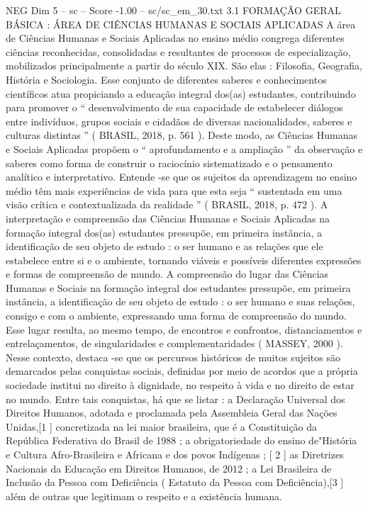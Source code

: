 \begin{textsample}{NEG Dim 5 – sc – Score -1.00 – sc/sc\_em\_30.txt}  \label{ex:f5_neg_254}
3.1 FORMAÇÃO GERAL BÁSICA : ÁREA DE CIÊNCIAS HUMANAS E SOCIAIS APLICADAS A área de Ciências Humanas e Sociais Aplicadas no ensino médio congrega diferentes ciências reconhecidas, consolidadas e resultantes de processos de especialização, mobilizados principalmente a partir do século XIX.
São elas : Filosofia, Geografia, História e Sociologia.
Esse conjunto de diferentes saberes e conhecimentos científicos atua propiciando a educação integral dos(as) estudantes, contribuindo para promover o “ desenvolvimento de sua capacidade de estabelecer diálogos entre indivíduos, grupos sociais e cidadãos de diversas nacionalidades, saberes e culturas distintas ” ( BRASIL, 2018, p. 561 ).
Deste modo, as Ciências Humanas e Sociais Aplicadas propõem o “ aprofundamento e a ampliação ” da observação e saberes como forma de construir o raciocínio sistematizado e o pensamento analítico e interpretativo.
Entende -se que os sujeitos da aprendizagem no ensino médio têm mais experiências de vida para que esta seja “ sustentada em uma visão crítica e contextualizada da realidade ” ( BRASIL, 2018, p. 472 ).
A interpretação e compreensão das Ciências Humanas e Sociais Aplicadas na formação integral dos(as) estudantes pressupõe, em primeira instância, a identificação de seu objeto de estudo : o ser humano e as relações que ele estabelece entre si e o ambiente, tornando viáveis e possíveis diferentes expressões e formas de compreensão de mundo.
A compreensão do lugar das Ciências Humanas e Sociais na formação integral dos estudantes pressupõe, em primeira instância, a identificação de seu objeto de estudo : o ser humano e suas relações, consigo e com o ambiente, expressando uma forma de compreensão do mundo.
Esse lugar resulta, ao mesmo tempo, de encontros e confrontos, distanciamentos e entrelaçamentos, de singularidades e complementaridades ( MASSEY, 2000 ).
Nesse contexto, destaca -se que os percursos históricos de muitos sujeitos são demarcados pelas conquistas sociais, definidas por meio de acordos que a própria sociedade institui no direito à dignidade, no respeito à vida e no direito de estar no mundo.
Entre tais conquistas, há que se listar : a Declaração Universal dos Direitos Humanos, adotada e proclamada pela Assembleia Geral das Nações Unidas,[1 ] concretizada na lei maior brasileira, que é a Constituição da República Federativa do Brasil de 1988 ; a obrigatoriedade do ensino de"História e Cultura Afro-Brasileira e Africana e dos povos Indígenas ; [ 2 ] as Diretrizes Nacionais da Educação em Direitos Humanos, de 2012 ; a Lei Brasileira de Inclusão da Pessoa com Deficiência ( Estatuto da Pessoa com Deficiência),[3 ] além de outras que legitimam o respeito e a existência humana.

\end{textsample}
